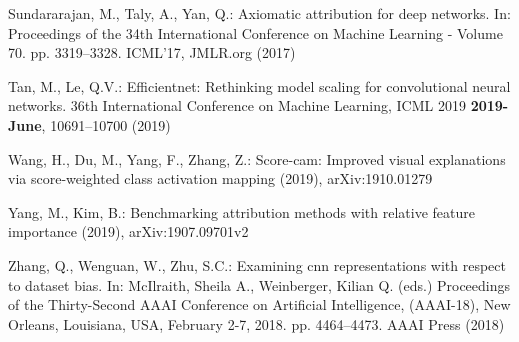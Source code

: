 \documentclass[runningheads]{llncs}
\begin{document}
\begin{thebibliography}{10}
Sundararajan, M., Taly, A., Yan, Q.: Axiomatic attribution for deep networks.
  In: Proceedings of the 34th International Conference on Machine Learning -
  Volume 70. pp. 3319--3328. ICML'17, JMLR.org (2017)

Tan, M., Le, Q.V.: Efficientnet: Rethinking model scaling for convolutional
  neural networks. 36th International Conference on Machine Learning, ICML 2019
   \textbf{2019-June},  10691--10700 (2019)

Wang, H., Du, M., Yang, F., Zhang, Z.: Score-cam: Improved visual explanations
  via score-weighted class activation mapping (2019), arXiv:1910.01279

Yang, M., Kim, B.: Benchmarking attribution methods with relative feature
  importance (2019), arXiv:1907.09701v2

Zhang, Q., Wenguan, W., Zhu, S.C.: Examining cnn representations with respect
  to dataset bias. In: {McIlraith, Sheila A.}, {Weinberger, Kilian Q.} (eds.)
  Proceedings of the Thirty-Second AAAI Conference on Artificial Intelligence,
  (AAAI-18), New Orleans, Louisiana, USA, February 2-7, 2018. pp. 4464--4473.
  {AAAI Press} (2018)

\end{thebibliography}

%
\end{document}
